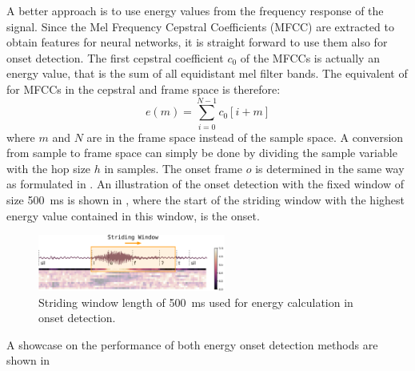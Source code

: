 A better approach is to use energy values from the frequency response of the signal.
Since the Mel Frequency Cepstral Coefficients (MFCC) are extracted to obtain features for neural networks, it is straight forward to use them also for onset detection.
The first cepstral coefficient $c_0$ of the MFCCs is actually an energy value, that is the sum of all equidistant mel filter bands.
The equivalent of  for MFCCs in the cepstral and frame space is therefore:
\begin{equation}
  e(m) = \sum_{i=0}^{N-1} c_0[i + m]
\end{equation}
where $m$ and $N$ are in the frame space instead of the sample space.
A conversion from sample to frame space can simply be done by dividing the sample variable with the hop size $h$ in samples.
The onset frame $o$ is determined in the same way as formulated in .
An illustration of the onset detection with the fixed window of size \SI{500}{\milli\second} is shown in , where
the start of the striding window with the highest energy value contained in this window, is the onset.
\begin{figure}[!ht]
  \centering
    \includegraphics[width=0.55\textwidth]{./3_signal/figs/signal_onset_window}
  \caption{Striding window length of \SI{500}{\milli\second} used for energy calculation in onset detection.}
  \label{fig:signal_onset_showcase}
\end{figure}
\FloatBarrier
\noindent
A showcase on the performance of both energy onset detection methods are shown in 
